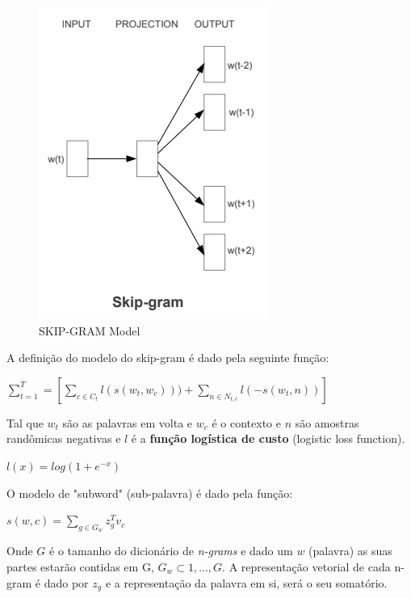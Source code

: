 \begin{figure}[htb]
	\caption{\label{skip_gram_model} SKIP-GRAM Model}
	\begin{center}
	    \includegraphics[scale=0.5]{artigo/recursos/imagens/skip_gram_model.png}
	\end{center}
\end{figure}

A definição do modelo do skip-gram é dado pela seguinte função:

\begin{center}\large
    $\sum_{t=1}^{T} = \left [ \sum_{c \in C_t} l(s(w_t, w_c))) + \sum_{n \in N_{t,c}} l(-s(w_t, n)) \right ]$
\end{center}

Tal que $w_t$ são as palavras em volta e $w_c$ é o contexto e $n$ são amostras randômicas negativas e $l$ é a \textbf{função logística de custo} (logistic loss function).

\begin{center}\large
    $l(x) = log(1 + e^{-x})$
\end{center}

O modelo de "subword" (sub-palavra) é dado pela função:

\begin{center}\large
    $s(w, c) = \sum_{g \in G_w} z_{g}^{T} v_c$
\end{center}

Onde $G$ é o tamanho do dicionário de \textit{n-grams} e dado um $w$ (palavra) as suas partes estarão contidas em G, $G_w \subset {1, ..., G}$. A representação vetorial de cada n-gram é dado por $z_g$ e a representação da palavra em si, será o seu somatório.

